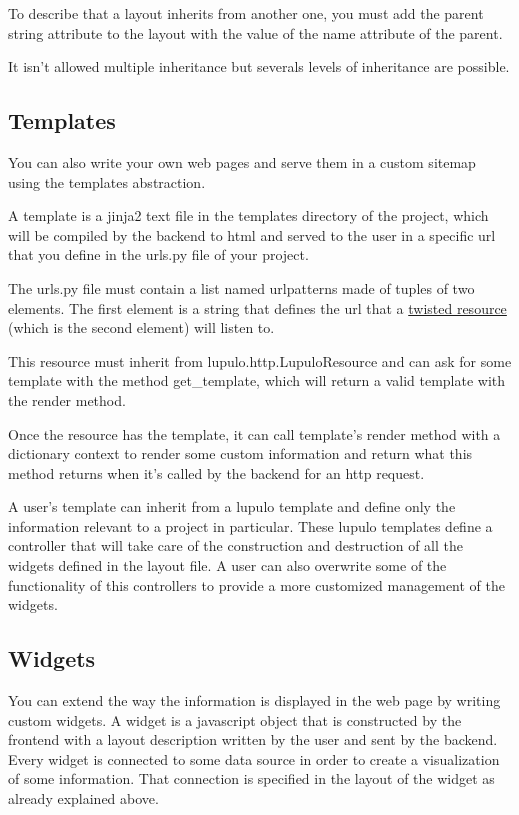 \documentclass[12pt]{article}
\begin{document}
                To describe that a layout inherits from another one, you must
                add the parent string attribute to the layout with the value of
                the name attribute of the parent.

                It isn't allowed multiple inheritance but severals levels of
                inheritance are possible.
            
        \subsection{Templates}
            You can also write your own web pages and serve them in a custom
            sitemap using the templates abstraction.

            A template is a jinja2 text file in the templates directory of the
            project, which will be compiled by the backend to html and served to
            the user in a specific url that you define in the urls.py file of
            your project.

            The urls.py file must contain a list named urlpatterns made of
            tuples of two elements. The first element is a string that defines
            the url that a
            \href{https://twistedmatrix.com/documents/15.0.0/web/howto/using-twistedweb.html#resource-objects}{twisted resource}
            (which is the second element) will listen to.

            This resource must inherit from lupulo.http.LupuloResource and can
            ask for some template with the method get\_template, which will
            return a valid template with the render method.

            Once the resource has the template, it can call template's render
            method with a dictionary context to render some custom information
            and return what this method returns when it's called by the backend
            for an http request.

            A user's template can inherit from a lupulo template and define only
            the information relevant to a project in particular. These lupulo
            templates define a controller that will take care of the
            construction and destruction of all the widgets defined in the
            layout file. A user can also overwrite some of the functionality of
            this controllers to provide a more customized management of the
            widgets.

        \subsection{Widgets}
            You can extend the way the information is displayed in the web page
            by writing custom widgets. A widget is a javascript object that is
            constructed by the frontend with a layout description written by the
            user and sent by the backend. Every widget is connected to some data
            source in order to create a visualization of some information. That
            connection is specified in the layout of the widget as already
            explained above.
\end{document}
